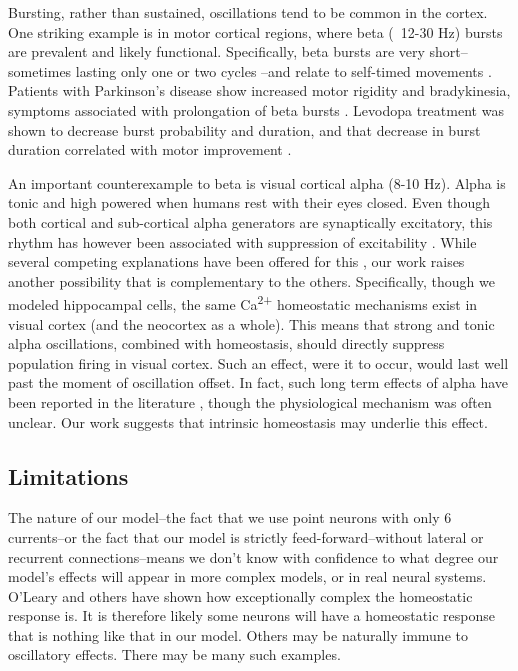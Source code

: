\documentclass{article}
\begin{document}
Bursting, rather than sustained, oscillations tend to be common in the cortex. One striking example is in motor cortical regions, where beta (~12-30 Hz) bursts are prevalent and likely functional. Specifically, beta bursts are very short--sometimes lasting only one or two cycles \cite{Sherman2016,Cole2019,Jones2016}--and relate to self-timed movements \cite{Feingold2015}. Patients with Parkinson's disease show increased motor rigidity and bradykinesia, symptoms associated with prolongation of beta bursts \cite{Tinkhauser2017}. Levodopa treatment was shown to decrease burst probability and duration, and that decrease in burst duration correlated with motor improvement \cite{Tinkhauser2017}.

An important counterexample to beta is visual cortical alpha (8-10 Hz). Alpha is tonic and high powered when humans rest with their eyes closed. Even though both cortical and sub-cortical alpha generators are synaptically excitatory, this rhythm has however been associated with suppression of excitability \cite{Jensen2002,Bonnefond2012,Peterson2017}. While several competing explanations have been offered for this \cite{Bonnefond2012,Lange2013,Peterson2017}, our work raises another possibility that is complementary to the others. Specifically, though we modeled hippocampal cells, the same Ca\textsuperscript{2+} homeostatic mechanisms exist in visual cortex (and the neocortex as a whole). This means that strong and tonic alpha oscillations, combined with homeostasis, should directly suppress population firing in visual cortex. Such an effect, were it to occur, would last well past the moment of oscillation offset. In fact, such long term effects of alpha have been reported in the literature \cite{Jensen2002,Bonnefond2012}, though the physiological mechanism was often unclear. Our work suggests that intrinsic homeostasis may underlie this effect.

\subsection*{Limitations}
The nature of our model--the fact that we use point neurons with only 6 currents--or the fact that our model is strictly feed-forward--without lateral or recurrent connections--means we don't know with confidence to what degree our model's effects will appear in more complex models, or in real neural systems. O'Leary \citep{OLeary2014} and others have shown how exceptionally complex the homeostatic response is. It is therefore likely some neurons will have a homeostatic response that is nothing like that in our model. Others may be naturally immune to oscillatory effects. There may be many such examples.
\end{document}
